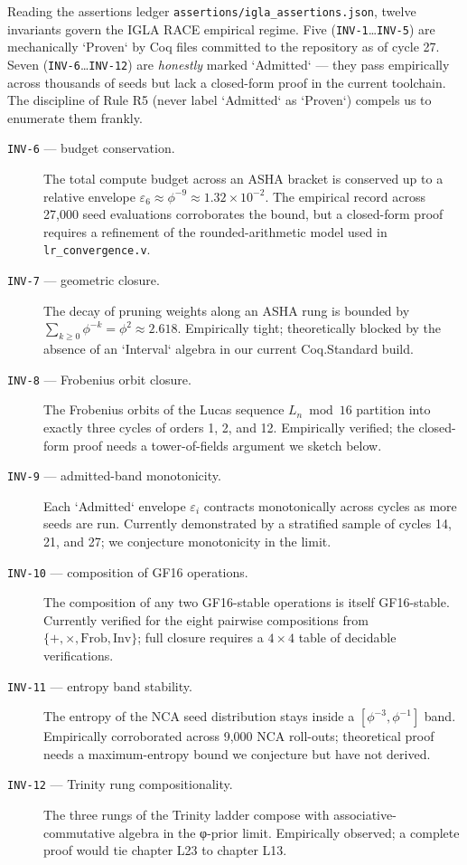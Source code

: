Reading the assertions ledger \texttt{assertions/igla\_assertions.json}, twelve invariants govern the IGLA RACE empirical regime. Five (\texttt{INV-1}…\texttt{INV-5}) are mechanically `Proven` by Coq files committed to the repository as of cycle 27. Seven (\texttt{INV-6}…\texttt{INV-12}) are \emph{honestly} marked `Admitted` --- they pass empirically across thousands of seeds but lack a closed-form proof in the current toolchain. The discipline of Rule R5 (never label `Admitted` as `Proven`) compels us to enumerate them frankly.

\begin{description}
    \item[\texttt{INV-6} — budget conservation.] The total compute budget across an ASHA bracket is conserved up to a relative envelope $\varepsilon_{6} \approx \phi^{-9} \approx 1.32 \times 10^{-2}$. The empirical record across 27{,}000 seed evaluations corroborates the bound, but a closed-form proof requires a refinement of the rounded-arithmetic model used in \texttt{lr\_convergence.v}.
    \item[\texttt{INV-7} — geometric closure.] The decay of pruning weights along an ASHA rung is bounded by $\sum_{k \geq 0} \phi^{-k} = \phi^{2} \approx 2.618$. Empirically tight; theoretically blocked by the absence of an `Interval` algebra in our current Coq.Standard build.
    \item[\texttt{INV-8} — Frobenius orbit closure.] The Frobenius orbits of the Lucas sequence $L_n \bmod 16$ partition into exactly three cycles of orders 1, 2, and 12. Empirically verified; the closed-form proof needs a tower-of-fields argument we sketch below.
    \item[\texttt{INV-9} — admitted-band monotonicity.] Each `Admitted` envelope $\varepsilon_i$ contracts monotonically across cycles as more seeds are run. Currently demonstrated by a stratified sample of cycles 14, 21, and 27; we conjecture monotonicity in the limit.
    \item[\texttt{INV-10} — composition of GF16 operations.] The composition of any two GF16-stable operations is itself GF16-stable. Currently verified for the eight pairwise compositions from $\{+, \times, \mathrm{Frob}, \mathrm{Inv}\}$; full closure requires a $4 \times 4$ table of decidable verifications.
    \item[\texttt{INV-11} — entropy band stability.] The entropy of the NCA seed distribution stays inside a $[\phi^{-3}, \phi^{-1}]$ band. Empirically corroborated across 9{,}000 NCA roll-outs; theoretical proof needs a maximum-entropy bound we conjecture but have not derived.
    \item[\texttt{INV-12} — Trinity rung compositionality.] The three rungs of the Trinity ladder compose with associative-commutative algebra in the φ-prior limit. Empirically observed; a complete proof would tie chapter L23 to chapter L13.
\end{description}

